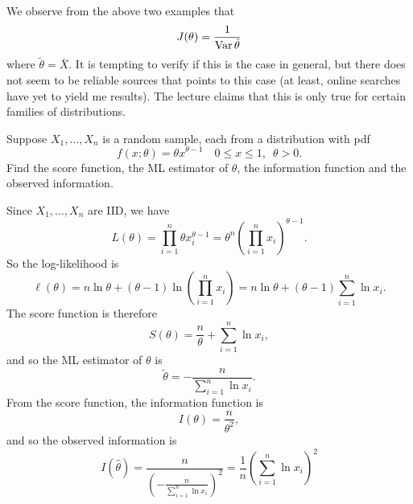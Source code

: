 \documentclass[notoc,notitlepage]{tufte-book}
\begin{document}
\begin{note}
  We observe from the above two examples that
  \begin{equation*}
    J(\theta) = \frac{1}{\operatorname{Var}{\tilde{\theta}}}
  \end{equation*}
  where $\tilde{\theta} = \bar{X}$. It is tempting to verify if this is the case in general, but there does not seem to be reliable sources that points to this case (at least, online searches have yet to yield me results). The lecture claims that this is only true for certain families of distributions.
\end{note}

\begin{eg}\label{eg:6_6}
  Suppose $X_1, ..., X_n$ is a random sample, each from a distribution with pdf
  \begin{equation*}
    f(x; \theta) = \theta x^{\theta - 1} \quad 0 \leq x \leq 1, \enspace \theta > 0.
  \end{equation*}
  Find the score function, the ML estimator of $\theta$, the information function and the observed information.
\end{eg}

\begin{solution}
  Since $X_1, ..., X_n$ are IID, we have
  \begin{equation*}
    L(\theta) = \prod_{i=1}^{n} \theta x_i^{\theta - 1} = \theta^n \left( \prod_{i=1}^{n} x_i \right)^{\theta - 1}.
  \end{equation*}
  So the log-likelihood is
  \begin{equation*}
    \ell(\theta) = n \ln \theta + ( \theta - 1 ) \ln \left( \prod_{i=1}^{n} x_i \right) = n \ln \theta + ( \theta - 1 ) \sum_{i=1}^{n} \ln x_i.
  \end{equation*}
  The score function is therefore
  \begin{equation*}
    S(\theta) = \frac{n}{\theta} + \sum_{i=1}^{n} \ln x_i,
  \end{equation*}
  and so the ML estimator of $\theta$ is
  \begin{equation*}
    \tilde{\theta} = - \frac{n}{\sum\limits_{i=1}^{n} \ln x_i}.
  \end{equation*}
  From the score function, the information function is
  \begin{equation*}
    I(\theta) = \frac{n}{\theta^2},
  \end{equation*}
  and so the observed information is
  \begin{equation*}
    I(\hat{\theta}) = \frac{n}{\left( - \frac{n}{\sum_{i=1}^{n} \ln x_i} \right)^2} = \frac{1}{n} \left( \sum_{i=1}^{n} \ln x_i \right)^2
  \end{equation*}
\end{solution}
\end{document}
